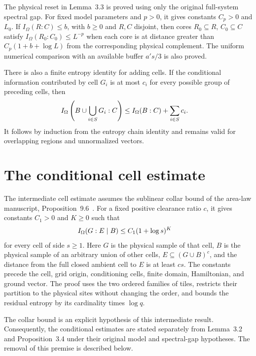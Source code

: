 \documentclass{article}
\begin{document}
The physical reset in Lemma~3.3 is proved using only the original
full-system spectral gap. For fixed model parameters and $p>0$, it gives
constants $C_p>0$ and $L_0$. If $I_\Omega(R:C)\le b$, with $b\ge0$ and
$R,C$ disjoint, then cores $R_0\subseteq R$, $C_0\subseteq C$ satisfy
$I_\Omega(R_0:C_0)\le L^{-p}$ when each core is at distance greater than
$C_p(1+b+\log L)$ from the corresponding physical complement.
The uniform numerical comparison with an available buffer $a's/3$ is
also proved.

There is also a finite entropy identity for adding cells. If the
conditional information contributed by cell $G_i$ is at most $c_i$ for
every possible group of preceding cells, then
\begin{align}
    I_\Omega\left(B\cup\bigcup_{i\in S}G_i:C\right)
     & \le I_\Omega(B:C)+\sum_{i\in S}c_i.
    \notag
\end{align}
It follows by induction from the entropy chain identity and remains valid
for overlapping regions and unnormalized vectors.

\section{The conditional cell estimate}

The intermediate cell estimate assumes the sublinear collar bound of the
area-law manuscript, Proposition~9.6~\cite{OpenAI2026AreaLaw}.
For a fixed positive clearance ratio $c$, it gives constants $C_1>0$ and
$K\ge0$ such that
\begin{align}
    I_\Omega(G:E\mid B) & \le C_1(1+\log s)^K
    \notag
\end{align}
for every cell of side $s\ge1$. Here $G$ is the physical sample of that
cell, $B$ is the physical sample of an arbitrary union of other cells,
$E\subseteq(G\cup B)^c$, and the distance from the full closed ambient
cell to $E$ is at least $cs$. The constants precede the cell, grid origin,
conditioning cells, finite domain, Hamiltonian, and ground vector.
The proof uses the two ordered families of tiles, restricts their
partition to the physical sites without changing the order, and bounds
the residual entropy by its cardinality times $\log q$.

The collar bound is an explicit hypothesis of this intermediate result.
Consequently, the conditional estimates are stated separately from
Lemma~3.2 and Proposition~3.4 under their original model and spectral-gap
hypotheses. The removal of this premise is described below.
\end{document}
